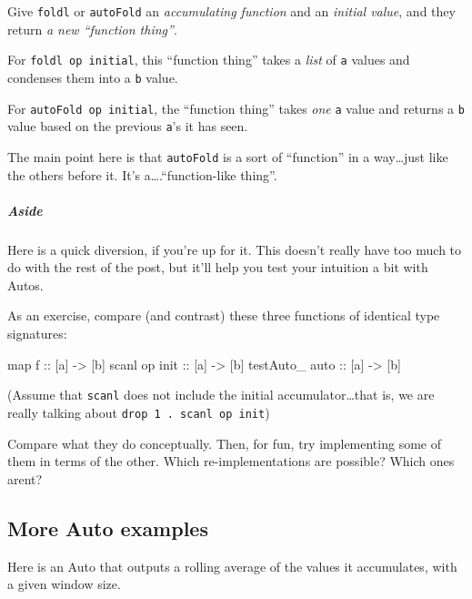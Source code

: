 \documentclass[]{article}
\newenvironment{Shaded}{}{}
\newcommand{\OtherTok}[1]{\textcolor[rgb]{0.00,0.44,0.13}{{#1}}}
\newcommand{\NormalTok}[1]{{#1}}
\begin{document}
Give \texttt{foldl} or \texttt{autoFold} an \emph{accumulating function} and an \emph{initial
value}, and they return \emph{a new ``function thing''}.

For \texttt{foldl\ op\ initial}, this ``function thing'' takes a \emph{list} of \texttt{a} values
and condenses them into a \texttt{b} value.

For \texttt{autoFold\ op\ initial}, the ``function thing'' takes \emph{one} \texttt{a} value and
returns a \texttt{b} value based on the previous \texttt{a}'s it has seen.

The main point here is that \texttt{autoFold} is a sort of ``function'' in a way\ldots{}just like
the others before it. It's a\ldots{}.``function-like thing''.

\subparagraph{Aside}\label{aside}

Here is a quick diversion, if you're up for it. This doesn't really have too much to do with the
rest of the post, but it'll help you test your intuition a bit with Autos.

As an exercise, compare (and contrast) these three functions of identical type signatures:

\begin{Shaded}
\begin{Highlighting}[]
\NormalTok{map}\OtherTok{       f       ::} \NormalTok{[a] }\OtherTok{->} \NormalTok{[b]}
\NormalTok{scanl     op}\OtherTok{ init ::} \NormalTok{[a] }\OtherTok{->} \NormalTok{[b]}
\NormalTok{testAuto_}\OtherTok{ auto    ::} \NormalTok{[a] }\OtherTok{->} \NormalTok{[b]}
\end{Highlighting}
\end{Shaded}

(Assume that \texttt{scanl} does not include the initial accumulator\ldots{}that is, we are really
talking about \texttt{drop\ 1\ .\ scanl\ op\ init})

Compare what they do conceptually. Then, for fun, try implementing some of them in terms of the
other. Which re-implementations are possible? Which ones arent?

\subsection{More Auto examples}\label{more-auto-examples}

Here is an Auto that outputs a rolling average of the values it accumulates, with a given window
size.
\end{document}
